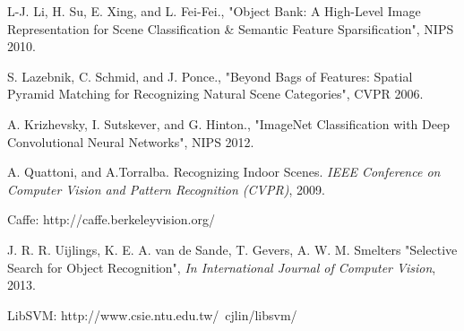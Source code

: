 \documentclass[letterpaper,twocolumn,10pt]{article}
\begin{document}
\fi

\begin{thebibliography}{10}

 L-J. Li, H. Su, E. Xing, and L. Fei-Fei.,
"Object Bank: A High-Level Image Representation for Scene Classification
\& Semantic Feature Sparsification",
NIPS 2010.

 S. Lazebnik, C. Schmid, and J. Ponce.,
"Beyond Bags of Features:
Spatial Pyramid Matching for Recognizing Natural Scene Categories",
CVPR 2006.

 A. Krizhevsky, I. Sutskever, and G. Hinton.,
"ImageNet Classification with Deep Convolutional Neural Networks",
NIPS 2012.

 A. Quattoni, and A.Torralba. Recognizing Indoor Scenes.
\emph{IEEE Conference on Computer Vision and Pattern Recognition (CVPR)},
2009.

 Caffe: http://caffe.berkeleyvision.org/

 J. R. R. Uijlings, K. E. A. van de Sande,
T. Gevers, A. W. M. Smelters
"Selective Search for Object Recognition",
\emph{In International Journal of Computer Vision}, 2013.

 LibSVM: http://www.csie.ntu.edu.tw/~cjlin/libsvm/

\end{thebibliography}
\end{document}
